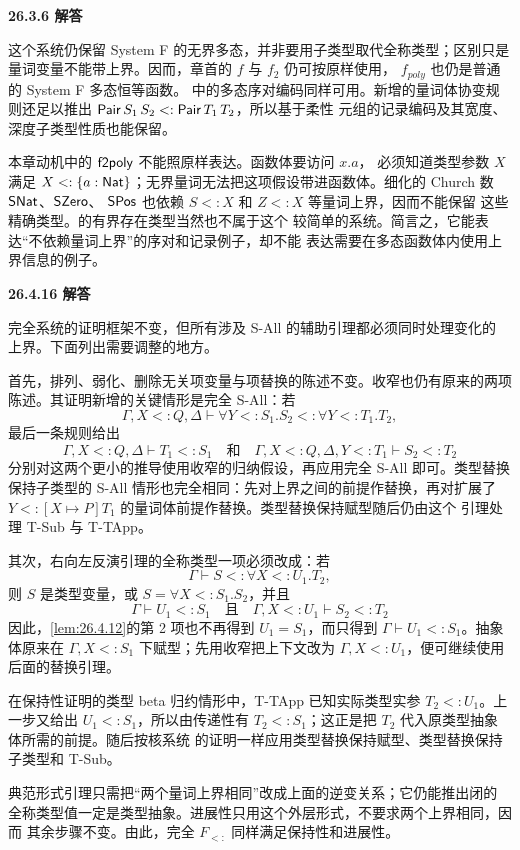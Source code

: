 \begin{taplsolutionentrybox}
\label{sol:translator:26.3.6}
\textbf{26.3.6 解答}

这个系统仍保留 System F 的无界多态，并非要用子类型取代全称类型；区别只是
量词变量不能带上界。因而，章首的 \(f\) 与 \(f_2\) 仍可按原样使用，
\(f_{\mathit{poly}}\) 也仍是普通的 System F 多态恒等函数。
中的多态序对编码同样可用。新增的量词体协变规则还足以推出
\(\mathsf{Pair}\,S_1\,S_2<:\mathsf{Pair}\,T_1\,T_2\)，所以基于柔性
元组的记录编码及其宽度、深度子类型性质也能保留。

本章动机中的 \(\mathsf{f2poly}\) 不能照原样表达。函数体要访问 \(x.a\)，
必须知道类型参数 \(X\) 满足
\(X<:\{a:\mathsf{Nat}\}\)；无界量词无法把这项假设带进函数体。细化的
Church 数 \(\mathsf{SNat}\)、\(\mathsf{SZero}\)、
\(\mathsf{SPos}\) 也依赖 \(S<:X\) 和 \(Z<:X\) 等量词上界，因而不能保留
这些精确类型。的有界存在类型当然也不属于这个
较简单的系统。简言之，它能表达“不依赖量词上界”的序对和记录例子，却不能
表达需要在多态函数体内使用上界信息的例子。
\end{taplsolutionentrybox}

\begin{taplsolutionentrybox}
\label{sol:translator:26.4.16}
\textbf{26.4.16 解答}

完全系统的证明框架不变，但所有涉及 S-All 的辅助引理都必须同时处理变化的
上界。下面列出需要调整的地方。

首先，排列、弱化、删除无关项变量与项替换的陈述不变。收窄也仍有原来的两项
陈述。其证明新增的关键情形是完全 S-All：若
\[
\Gamma,X<:Q,\Delta\vdash
\forall Y<:S_1.S_2<:\forall Y<:T_1.T_2,
\]
最后一条规则给出
\[
\Gamma,X<:Q,\Delta\vdash T_1<:S_1
\quad\text{和}\quad
\Gamma,X<:Q,\Delta,Y<:T_1\vdash S_2<:T_2
\]
分别对这两个更小的推导使用收窄的归纳假设，再应用完全 S-All 即可。类型替换
保持子类型的 S-All 情形也完全相同：先对上界之间的前提作替换，再对扩展了
\(Y<:[X\mapsto P]T_1\) 的量词体前提作替换。类型替换保持赋型随后仍由这个
引理处理 T-Sub 与 T-TApp。

其次，右向左反演引理的全称类型一项必须改成：若
\[
\Gamma\vdash S<:\forall X<:U_1.T_2,
\]
则 \(S\) 是类型变量，或
\(S=\forall X<:S_1.S_2\)，并且
\[
\Gamma\vdash U_1<:S_1
\quad\text{且}\quad
\Gamma,X<:U_1\vdash S_2<:T_2
\]
因此，\cref{lem:26.4.12}的第 2 项也不再得到 \(U_1=S_1\)，而只得到
\(\Gamma\vdash U_1<:S_1\)。抽象体原来在
\(\Gamma,X<:S_1\) 下赋型；先用收窄把上下文改为
\(\Gamma,X<:U_1\)，便可继续使用后面的替换引理。

在保持性证明的类型 beta 归约情形中，T-TApp 已知实际类型实参
\(T_2<:U_1\)。上一步又给出 \(U_1<:S_1\)，所以由传递性有
\(T_2<:S_1\)；这正是把 \(T_2\) 代入原类型抽象体所需的前提。随后按核系统
的证明一样应用类型替换保持赋型、类型替换保持子类型和 T-Sub。

典范形式引理只需把“两个量词上界相同”改成上面的逆变关系；它仍能推出闭的
全称类型值一定是类型抽象。进展性只用这个外层形式，不要求两个上界相同，因而
其余步骤不变。由此，完全 \(F_{<:}\) 同样满足保持性和进展性。
\end{taplsolutionentrybox}
